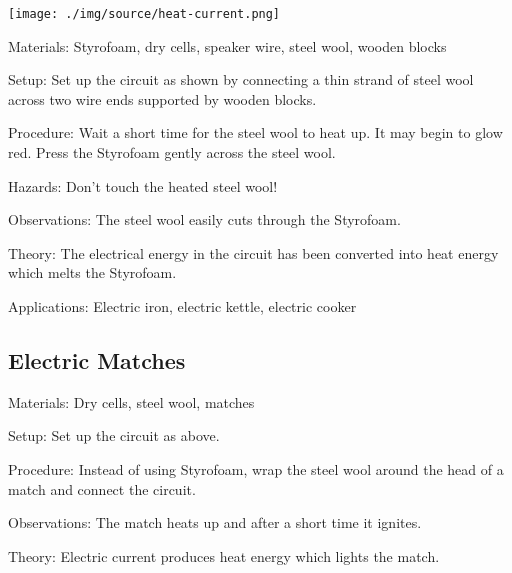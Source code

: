 \begin{multicols}{2}
\begin{center}
\texttt{[image: ./img/source/heat-current.png]}
\end{center}

\begin{description*}
\item[Materials:]{Styrofoam, dry cells, speaker wire, steel wool, wooden blocks}
\item[Setup:]{Set up the circuit as shown by connecting a thin strand of steel wool across two wire ends supported by wooden blocks.}
\item[Procedure:]{Wait a short time for the steel wool to heat up. It may begin to glow red. Press the Styrofoam gently across the steel wool.}
\item[Hazards:]{Don't touch the heated steel wool!}
\item[Observations:]{The steel wool easily cuts through the Styrofoam.}
\item[Theory:]{The electrical energy in the circuit has been converted into heat energy which melts the Styrofoam.}
\item[Applications:]{Electric iron, electric kettle, electric cooker}
\end{description*}

\subsection{Electric Matches}


\begin{description*}
\item[Materials:]{Dry cells, steel wool, matches}
\item[Setup:]{Set up the circuit as above.}
\item[Procedure:]{Instead of using Styrofoam, wrap the steel wool around the head of a match and connect the circuit.}
\item[Observations:]{The match heats up and after a short time it ignites.}
\item[Theory:]{Electric current produces heat energy which lights the match.}
\end{description*}


\end{multicols}
